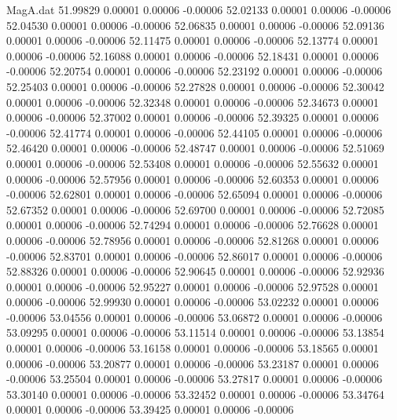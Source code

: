 \begin{filecontents}{MagA.dat}
  51.99829    0.00001    0.00006   -0.00006
  52.02133    0.00001    0.00006   -0.00006
  52.04530    0.00001    0.00006   -0.00006
  52.06835    0.00001    0.00006   -0.00006
  52.09136    0.00001    0.00006   -0.00006
  52.11475    0.00001    0.00006   -0.00006
  52.13774    0.00001    0.00006   -0.00006
  52.16088    0.00001    0.00006   -0.00006
  52.18431    0.00001    0.00006   -0.00006
  52.20754    0.00001    0.00006   -0.00006
  52.23192    0.00001    0.00006   -0.00006
  52.25403    0.00001    0.00006   -0.00006
  52.27828    0.00001    0.00006   -0.00006
  52.30042    0.00001    0.00006   -0.00006
  52.32348    0.00001    0.00006   -0.00006
  52.34673    0.00001    0.00006   -0.00006
  52.37002    0.00001    0.00006   -0.00006
  52.39325    0.00001    0.00006   -0.00006
  52.41774    0.00001    0.00006   -0.00006
  52.44105    0.00001    0.00006   -0.00006
  52.46420    0.00001    0.00006   -0.00006
  52.48747    0.00001    0.00006   -0.00006
  52.51069    0.00001    0.00006   -0.00006
  52.53408    0.00001    0.00006   -0.00006
  52.55632    0.00001    0.00006   -0.00006
  52.57956    0.00001    0.00006   -0.00006
  52.60353    0.00001    0.00006   -0.00006
  52.62801    0.00001    0.00006   -0.00006
  52.65094    0.00001    0.00006   -0.00006
  52.67352    0.00001    0.00006   -0.00006
  52.69700    0.00001    0.00006   -0.00006
  52.72085    0.00001    0.00006   -0.00006
  52.74294    0.00001    0.00006   -0.00006
  52.76628    0.00001    0.00006   -0.00006
  52.78956    0.00001    0.00006   -0.00006
  52.81268    0.00001    0.00006   -0.00006
  52.83701    0.00001    0.00006   -0.00006
  52.86017    0.00001    0.00006   -0.00006
  52.88326    0.00001    0.00006   -0.00006
  52.90645    0.00001    0.00006   -0.00006
  52.92936    0.00001    0.00006   -0.00006
  52.95227    0.00001    0.00006   -0.00006
  52.97528    0.00001    0.00006   -0.00006
  52.99930    0.00001    0.00006   -0.00006
  53.02232    0.00001    0.00006   -0.00006
  53.04556    0.00001    0.00006   -0.00006
  53.06872    0.00001    0.00006   -0.00006
  53.09295    0.00001    0.00006   -0.00006
  53.11514    0.00001    0.00006   -0.00006
  53.13854    0.00001    0.00006   -0.00006
  53.16158    0.00001    0.00006   -0.00006
  53.18565    0.00001    0.00006   -0.00006
  53.20877    0.00001    0.00006   -0.00006
  53.23187    0.00001    0.00006   -0.00006
  53.25504    0.00001    0.00006   -0.00006
  53.27817    0.00001    0.00006   -0.00006
  53.30140    0.00001    0.00006   -0.00006
  53.32452    0.00001    0.00006   -0.00006
  53.34764    0.00001    0.00006   -0.00006
  53.39425    0.00001    0.00006   -0.00006

\end{filecontents}
